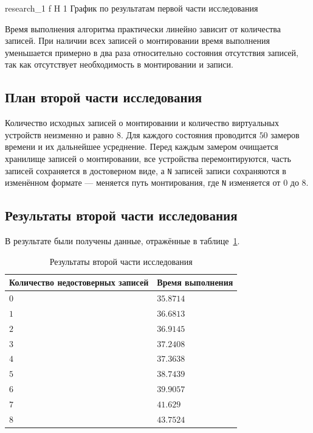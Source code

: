     {research_1}
    {f}
    {H}
    {1\textwidth}
    {График по результатам первой части исследования}

Время выполнения алгоритма практически линейно зависит от количества записей. При наличии всех 
записей о монтировании время выполнения уменьшается примерно в два раза относительно состояния отсутствия записей,
так как отсутствует необходимость в монтировании и записи.

\subsection{План второй части исследования}

Количество исходных записей о монтировании и количество виртуальных устройств неизменно и равно $8$.
Для каждого состояния проводится $50$ замеров времени и их дальнейшее усреднение.
Перед каждым замером очищается хранилище записей о монтировании, все устройства перемонтируются,
часть записей сохраняется в достоверном виде, а \texttt{N} записей записи сохраняются в изменённом 
формате --- меняется путь монтирования, где \texttt{N} изменяется от $0$ до $8$.

\subsection{Результаты второй части исследования}

В результате были получены данные, отражённые в таблице~\ref{tab:res_2}.

\begin{table}[H]
    \caption{Результаты второй части исследования}
    \begin{tabular}{|p{10cm}|p{5cm}|}
    \hline

    \textbf{Количество недостоверных записей}
    & \textbf{Время выполнения} \\
    \hline

    $0$ & $35.8714$ \\ \hline
    $1$ & $36.6813$ \\ \hline
    $2$ & $36.9145$ \\ \hline
    $3$ & $37.2408$ \\ \hline
    $4$ & $37.3638$ \\ \hline
    $5$ & $38.7439$ \\ \hline
    $6$ & $39.9057$ \\ \hline
    $7$ & $41.629$  \\ \hline
    $8$ & $43.7524$ \\ \hline

    \end{tabular}
    \label{tab:res_2}
\end{table}

